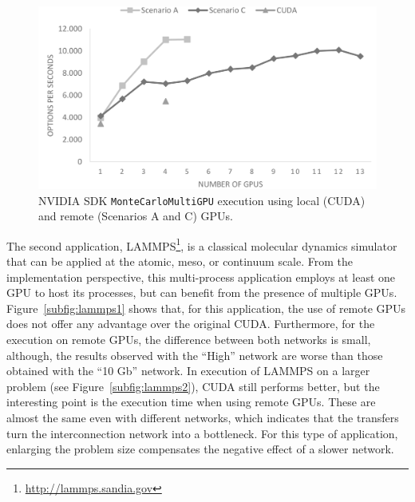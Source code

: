 \documentclass[a4paper,twoside]{article}
\begin{document}
\begin{figure}[htb]
  \centering
  \includegraphics[width=\linewidth]{images/mont.pdf}
  \caption{NVIDIA SDK {\tt MonteCarloMultiGPU} execution using local (CUDA) and remote (Scenarios A and C) GPUs.}
  \label{fig:mont-opt}
\end{figure}

The second application, LAMMPS\footnote{\url{http://lammps.sandia.gov}}, 
is a classical molecular dynamics simulator that can be applied at the atomic, 
meso, or continuum scale. 
From the implementation perspective, this multi-process application employs 
at least one GPU to host its processes, but can benefit from the presence of multiple GPUs.
Figure~\ref{subfig:lammps1} shows that, for this application, the use of remote GPUs 
does not offer any advantage over the original CUDA. 
Furthermore, for the execution on remote GPUs, the difference between both networks is small, although, the results observed with the ``High'' network are worse than those obtained with the ``10 Gb'' network.
In execution of LAMMPS on a larger problem (see Figure~\ref{subfig:lammps2}), CUDA still performs better, but the interesting point is the execution time when using remote GPUs. 
These are almost the same even with different networks, which indicates that the transfers turn the interconnection network into a bottleneck. 
For this type of application, enlarging the problem size compensates the negative effect of a slower network.
\end{document}
